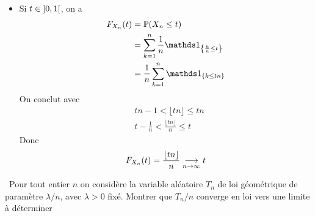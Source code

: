 {\begin{td-sol}
\begin{itemize}[\ptr{}]
\begin{itemize}[\ptr{}]
                \item Si \(t\in\mathopen{}\left]0,1\right[\mathclose{}\), on a
                \begin{equation*}
                    \begin{aligned}
                        F_{X_n}(t)
                        &= \bb P(X_n\leq t)\\
                        &= \sum_{k=1}^n \frac{1}{n} \one_{\left\{\frac{k}{n}\leq t\right\}}\\
                        &=\frac{1}{n} \sum_{k=1}^n\one_{\left\{k\leq tn \right\}}\\
                    \end{aligned}
                \end{equation*}
                On conclut avec
                \begin{equation*}
                    \begin{aligned}
                        & tn-1< \lfloor tn\rfloor \leq tn\\
                        & t-\frac{1}{n}<\frac{\lfloor tn\rfloor}{n}\leq t
                    \end{aligned}
                \end{equation*}
                Donc
                \begin{equation*}
                    F_{X_n}(t) = \frac{\lfloor tn\rfloor}{n} \underset{n\to\infty}{\longrightarrow} t
                \end{equation*}
            \end{itemize}
        \end{itemize}
    \end{td-sol}
}{}

\begin{td-exo}[]\,
    Pour tout entier \(n\) on considère la variable aléatoire \(T_n\)
    de loi géométrique de paramètre \(\lambda/n\), avec \(\lambda>0\)
    fixé. Montrer que \(T_n/n\) converge en loi vers une limite à déterminer
\end{td-exo}

